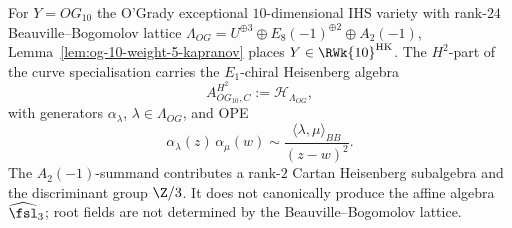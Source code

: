 \begin{theorem}
\label{thm:phi-10-og-10}
%
%
For $Y = OG_{10}$ the O'Grady exceptional $10$-dimensional IHS
variety with rank-$24$ Beauville--Bogomolov lattice
$\Lambda_{OG} = U^{\oplus 3} \oplus E_8(-1)^{\oplus 2} \oplus
A_2(-1)$,
Lemma~\ref{lem:og-10-weight-5-kapranov} places
\(Y \in \RWk{10}^{\mathrm{HK}}\). The \(H^2\)-part of the curve
specialisation carries the \(E_1\)-chiral Heisenberg algebra
\begin{equation}
\label{eq:phi-10-og-10-master}
 A^{H^2}_{OG_{10},C}:=\mathcal H_{\Lambda_{OG}},
\end{equation}
with generators \(\alpha_\lambda\), \(\lambda\in\Lambda_{OG}\), and OPE
\[
 \alpha_\lambda(z)\,\alpha_\mu(w) \sim
 \frac{\langle \lambda,\mu\rangle_{BB}}{(z-w)^2}.
\]
The \(A_2(-1)\)-summand contributes a rank-\(2\) Cartan Heisenberg
subalgebra and the discriminant group \(\Z/3\). It does not canonically
produce the affine algebra \(\widehat{\fsl}_3\); root fields are not
determined by the Beauville--Bogomolov lattice.
\end{theorem}

